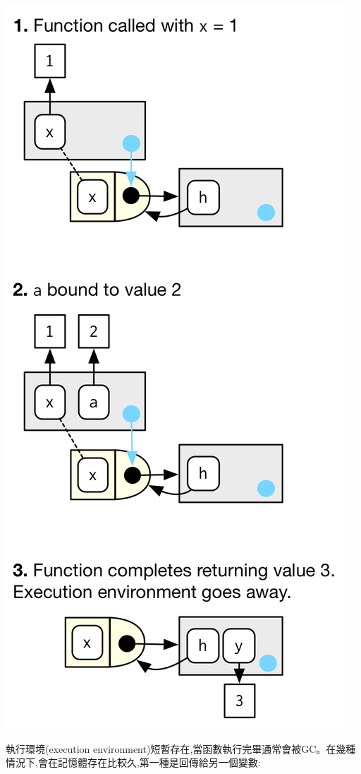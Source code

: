 \documentclass[]{book}
\theoremstyle{definition}
\theoremstyle{definition}
\theoremstyle{definition}
\theoremstyle{remark}
\begin{document}
\begin{center}\includegraphics{diagrams/environments/execution} \end{center}

執行環境(execution
environment)短暫存在,當函數執行完畢通常會被GC。在幾種情況下,會在記憶體存在比較久,第一種是回傳給另一個變數:
\end{document}
